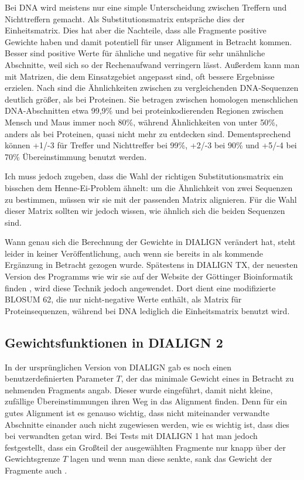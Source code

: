 Bei DNA wird meistens nur eine simple Unterscheidung zwischen Treffern und Nichttreffern gemacht. Als Substitutionsmatrix entspräche dies der Einheitsmatrix. Dies hat aber die Nachteile, dass alle Fragmente positive Gewichte haben und damit potentiell für unser Alignment in Betracht kommen. Besser sind positive Werte für ähnliche und negative für sehr unähnliche Abschnitte, weil sich so der Rechenaufwand verringern lässt. Außerdem kann man mit Matrizen, die dem Einsatzgebiet angepasst sind, oft bessere Ergebnisse erzielen. Nach \cite{p13} sind die Ähnlichkeiten zwischen zu vergleichenden DNA-Sequenzen deutlich größer, als bei Proteinen. Sie betragen zwischen homologen menschlichen DNA-Abschnitten etwa 99,9\% und bei proteinkodierenden Regionen zwischen Mensch und Maus immer noch 80\%, während Ähnlichkeiten von unter 50\%, anders als bei Proteinen, quasi nicht mehr zu entdecken sind. Dementsprechend können +1/-3 für Treffer und Nichttreffer bei 99\%, +2/-3 bei 90\% und +5/-4 bei 70\% Übereinstimmung benutzt werden.

Ich muss jedoch zugeben, dass die Wahl der richtigen Substitutionsmatrix ein bisschen dem Henne-Ei-Problem ähnelt: um die Ähnlichkeit von zwei Sequenzen zu bestimmen, müssen wir sie mit der passenden Matrix alignieren. Für die Wahl dieser Matrix sollten wir jedoch wissen, wie ähnlich sich die beiden Sequenzen sind.

Wann genau sich die Berechnung der Gewichte in DIALIGN verändert hat, steht leider in keiner Veröffentlichung, auch wenn sie bereits in \cite{mdw96} als kommende Ergänzung in Betracht gezogen wurde. Spätestens in DIALIGN TX, der neuesten Version des Programms wie wir sie auf der Website der Göttinger Bioinformatik finden \citep{DIALIGNTX}, wird diese Technik jedoch angewendet. Dort dient eine modifizierte BLOSUM 62, die nur nicht-negative Werte enthält, als Matrix für Proteinsequenzen, während bei DNA lediglich die Einheitsmatrix benutzt wird.

\subsection{Gewichtsfunktionen in DIALIGN 2} 

In der ursprünglichen Version von DIALIGN gab es noch einen benutzerdefinierten Parameter $T$, der das minimale Gewicht eines in Betracht zu nehmenden Fragments angab. Dieser wurde eingeführt, damit nicht kleine, zufällige Übereinstimmungen ihren Weg in das Alignment finden. Denn für ein gutes Alignment ist es genauso wichtig, dass nicht miteinander verwandte Abschnitte einander auch nicht zugewiesen werden, wie es wichtig ist, dass dies bei verwandten getan wird. Bei Tests mit DIALIGN 1 hat man jedoch festgestellt, dass ein Großteil der ausgewählten Fragmente nur knapp über der Gewichtsgrenze $T$ lagen und wenn man diese senkte, sank das Gewicht der Fragmente auch \citep{mahd98}. 

